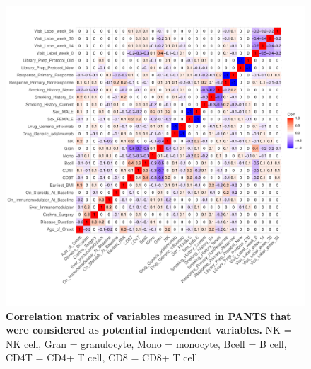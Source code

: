 \begin{figure}
    \centering
    \includegraphics[width=1.0\textwidth,page=1]{mainmatter/figures/chapter_04/process_pheno.pheno_filtered_dge.ggcorrplot.pdf}
    \caption{
        \textbf{Correlation matrix of variables measured in \gls{PANTS} that were considered as potential independent variables.}
        NK = \gls{NK} cell, Gran = granulocyte, Mono = monocyte, Bcell = B cell, CD4T = CD4+ T cell, CD8 = CD8+ T cell.
    }
    \label{fig:multipants_pheno_filtered_ggcorrplot}
\end{figure}



